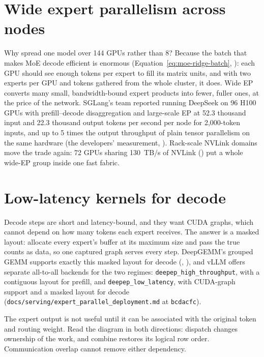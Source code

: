 \section{Wide expert parallelism across nodes}

Why spread one model over 144 GPUs rather than 8? Because the batch that makes
MoE decode efficient is enormous (Equation~\ref{eq:moe-ridge-batch},
): each GPU should see enough tokens per expert to
fill its matrix units, and with two experts per GPU and tokens gathered from
the whole cluster, it does. Wide EP converts many small, bandwidth-bound expert
products into fewer, fuller ones, at the price of the network. SGLang's team
reported running DeepSeek on 96 H100 GPUs with prefill--decode disaggregation
and large-scale EP at 52.3 thousand input and 22.3 thousand output tokens per
second per node for 2,000-token inputs, and up to 5 times the output throughput
of plain tensor parallelism on the same hardware (the developers'
measurement, \cite{sglang2025largeep}). Rack-scale NVLink domains move the
trade again: 72 GPUs sharing 130~TB/s of NVLink ()
put a whole wide-EP group inside one fast fabric.

\section{Low-latency kernels for decode}

Decode steps are short and latency-bound, and they want CUDA graphs, which
cannot depend on how many tokens each expert receives. The answer is a masked
layout: allocate every expert's buffer at its maximum size and pass the true
counts as data, so one captured graph serves every step. DeepGEMM's grouped
GEMM supports exactly this masked layout for decode (,
\cite{deepseek2025deepgemm}), and vLLM offers separate all-to-all backends for
the two regimes: \texttt{deepep\_high\_throughput}, with a contiguous layout for
prefill, and \texttt{deepep\_low\_latency}, with CUDA-graph support and a masked
layout for decode (\texttt{docs/serving/expert\_parallel\_deployment.md} at
\texttt{bcdacfc}).

The expert output is not useful until it can be associated with the original token and routing weight. Read the diagram in both directions: dispatch changes ownership of the work, and combine restores its logical row order. Communication overlap cannot remove either dependency.


